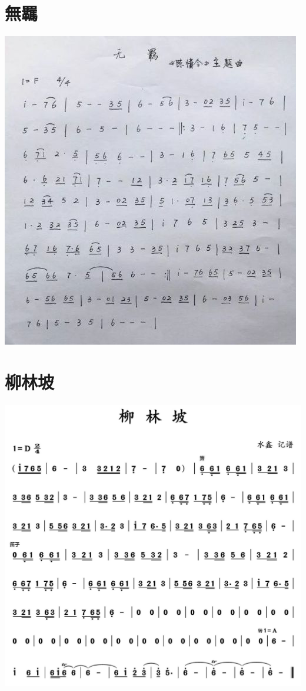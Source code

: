 \documentclass[cn,pad,chinesefont=nofont,twocol]{elegantbook}
\begin{document}
\section{無羈}
    \includegraphics[width=\textwidth]{dongxiao/20201231-無羈} 

\section{柳林坡}
    \includegraphics[width=\textwidth]{dongxiao/20201231-柳林坡}
\end{document}
